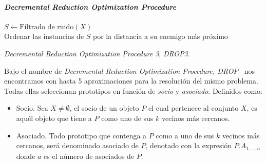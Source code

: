 \paragraph{\textit{Decremental Reduction Optimization Procedure}}\label{paragraph:DROP}
\hfill \break
\begin{algorithm}[H]
  	\BlankLine
  $S \leftarrow \text{Filtrado de ruido}(X)$ \\
	Ordenar las instancias de $S$ por la distancia a su enemigo más próximo \\
	\caption{\textit{Decremental Reduction Optimization Procedure 3}, \textit{DROP3}.}\label{alg:DROP3}
\end{algorithm}
Bajo el nombre de \textit{Decremental Reduction Optimization Procedure, DROP}~\cite{wilson2000reduction} nos encontramos con hasta 5 aproximaciones para la resolución del mismo problema. Todas ellas seleccionan prototipos en función de \textit{socio} y \textit{asociado}. Definidos como:
\begin{itemize}
\item Socio. Sea $X \not= \emptyset$, el socio de un objeto $P$ el cual pertenece al conjunto $X$, es aquél objeto que tiene a $P$ como uno de sus $k$ vecinos más cercanos.
\item Asociado. Todo prototipo que contenga a $P$ como a uno de sus $k$ vecinos más cercanos, será denominado asociado de $P$, denotado con la expresión $P.A_{1,\dots,a}$ donde $a$ es el número de asociados de $P$.
\end{itemize}

